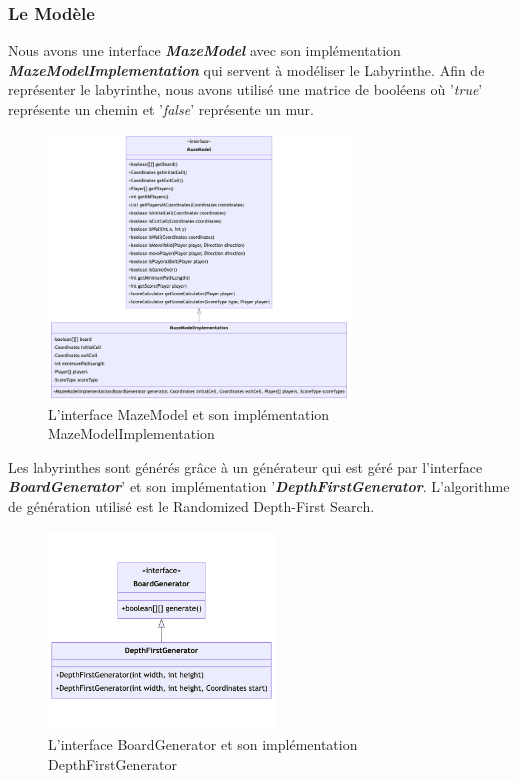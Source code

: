 \subsubsection{Le Modèle}
\label{subsubsec:modele}

Nous avons une interface \textbf{\textit{MazeModel}} avec son implémentation
\textbf{\textit{MazeModelImplementation}} qui servent à modéliser le
Labyrinthe. Afin de représenter le labyrinthe, nous avons utilisé une matrice
de booléens où '\textit{true}' représente un chemin et '\textit{false}'
représente un mur.

\begin{figure}[h!]
    \centering
    \includegraphics[width=8cm]{ressources/Implementation/Labyrinthe/Modele/MazeModelAndImplementation.png}
    \caption{L'interface MazeModel et son implémentation MazeModelImplementation}
    \label{fig:MazeModelAndImplementation}
\end{figure}

Les labyrinthes sont générés grâce à un générateur qui est géré par l'interface
\textbf{\textit{BoardGenerator}}' et son implémentation
'\textbf{\textit{DepthFirstGenerator}}. L'algorithme de génération utilisé est
le Randomized Depth-First Search.

\begin{figure}[h!]
    \centering
    \includegraphics[width=6cm]{ressources/Implementation/Labyrinthe/Modele/DepthFirstGenerator.png}
    \caption{L'interface BoardGenerator et son implémentation DepthFirstGenerator}
    \label{fig:BoardGeneratorAndDepthFirstGenerator}
\end{figure}

